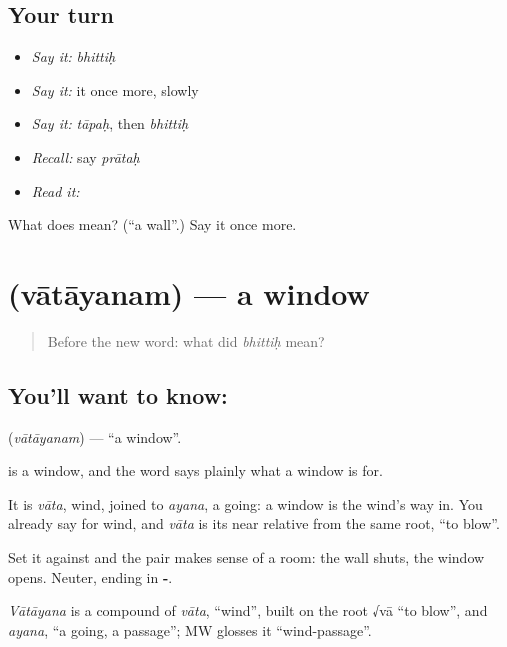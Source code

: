 \subsection*{Your turn}
\begin{itemize}
\raggedright
  \item \emph{Say it:} \emph{bhittiḥ}
  \item \emph{Say it:} it once more, slowly
  \item \emph{Say it:} \emph{tāpaḥ}, then \emph{bhittiḥ}
  \item \emph{Recall:} say \emph{prātaḥ}
  \item \emph{Read it:} \textbf{}
\end{itemize}

\begin{tcolorbox}[breakable,colback=teal!4,colframe=teal!35!black,title={Before you move on}]
What does  mean? (\textquotedblleft{}a wall\textquotedblright{}.) Say it once more.
\end{tcolorbox}
\section[\texorpdfstring{\sk{वातायनम्} (vātāyanam)}{वातायनम् (vātāyanam)}]{ (vātāyanam) — a window}

\label{lesson:SA-C47-window}



\begin{quote}
Before the new word: what did \emph{bhittiḥ} mean?
\end{quote}

\subsection*{You'll want to know: }
\textbf{} (\emph{vātāyanam}) — \textquotedblleft{}a window\textquotedblright{}.

\textbf{} is a window, and the word says plainly what a window is for.

It is \emph{vāta}, wind, joined to \emph{ayana}, a going: a window is the wind's way in. You already say  for wind, and \emph{vāta} is its near relative from the same root, \textquotedblleft{}to blow\textquotedblright{}.

Set it against  and the pair makes sense of a room: the wall shuts, the window opens. Neuter, ending in \textbf{-}.

\begin{cousinweb}
\emph{Vātāyana} is a compound of \emph{vāta}, \textquotedblleft{}wind\textquotedblright{}, built on the root √vā \textquotedblleft{}to blow\textquotedblright{}, and \emph{ayana}, \textquotedblleft{}a going, a passage\textquotedblright{}; MW glosses it \textquotedblleft{}wind-passage\textquotedblright{}.
\end{cousinweb}

